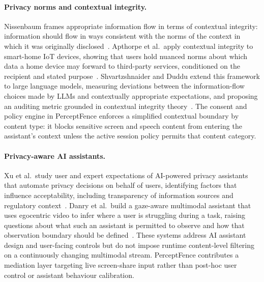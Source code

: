 \documentclass[sn-mathphys-num]{sn-jnl}
\begin{document}
\paragraph{Privacy norms and contextual integrity.}
Nissenbaum frames appropriate information flow in terms of contextual
integrity: information should flow in ways consistent with the norms of the
context in which it was originally disclosed~\cite{nissenbaum2004privacy}.
Apthorpe et al.\ apply contextual integrity to smart-home IoT devices, showing
that users hold nuanced norms about which data a home device may forward to
third-party services, conditioned on the recipient and stated
purpose~\cite{apthorpe2018smart}.
Shvartzshnaider and Duddu extend this framework to large language models,
measuring deviations between the information-flow choices made by LLMs and
contextually appropriate expectations, and proposing an auditing metric
grounded in contextual integrity theory~\cite{shvartzshnaider2026privacy}.
The consent and policy engine in PerceptFence enforces a simplified contextual
boundary by content type: it blocks sensitive screen and speech content from
entering the assistant's context unless the active session policy permits that
content category.

\paragraph{Privacy-aware AI assistants.}
Xu et al.\ study user and expert expectations of AI-powered privacy assistants
that automate privacy decisions on behalf of users, identifying factors that
influence acceptability, including transparency of information sources and
regulatory context~\cite{xu2025acceptability}.
Danry et al.\ build a gaze-aware multimodal assistant that uses egocentric video
to infer where a user is struggling during a task, raising questions about what
such an assistant is permitted to observe and how that observation boundary
should be defined~\cite{danry2026gaze}.
These systems address AI assistant design and user-facing controls but do not
impose runtime content-level filtering on a continuously changing multimodal
stream.
PerceptFence contributes a mediation layer targeting live screen-share input
rather than post-hoc user control or assistant behaviour calibration.
\end{document}
